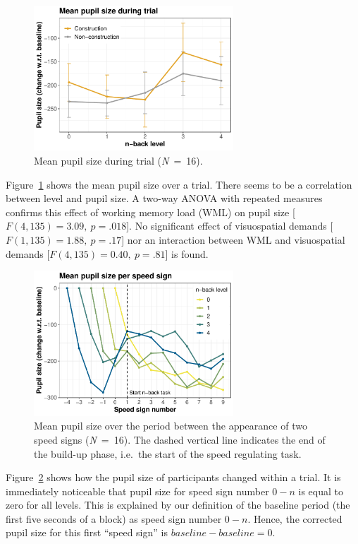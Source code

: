 \begin{figure}
  \centering
  \includegraphics[width=7.5cm]{images/pupil_size_interaction.pdf}
  \caption{Mean pupil size during trial (\textit{N}\ =\ 16).}
  \label{fig:mean-ps}
\end{figure}
Figure~\ref{fig:mean-ps} shows the mean pupil size over a trial. 
There seems to be a correlation between \nback level and pupil size.
A two-way ANOVA with repeated measures confirms this effect of working memory load (WML) on pupil size [\(F(4,135)=3.09,\ p=.018\)].
No significant effect of visuospatial demands [\(F(1,135)=1.88,\ p=.17\)] nor an interaction between WML and visuospatial demands [\(F(4,135)=0.40,\ p=.81\)] is found.

\begin{figure}
  \centering
  \includegraphics[width=7.5cm]{images/speed_sign_nback.pdf}
  \caption{Mean pupil size over the period between the appearance of two speed signs (\textit{N}\ =\ 16).
  The dashed vertical line indicates the end of the build-up phase, i.e.\ the start of the speed regulating task.}
  \label{fig:ps-speed-sign}    
\end{figure}

Figure~\ref{fig:ps-speed-sign} shows how the pupil size of participants changed within a trial.
It is immediately noticeable that pupil size for speed sign number \(0-n\) is equal to zero for all \nback levels.
This is explained by our definition of the baseline period (the first five seconds of a block) as speed sign number \(0-n\).
Hence, the corrected pupil size for this first ``speed sign'' is \(baseline-baseline=0\).

